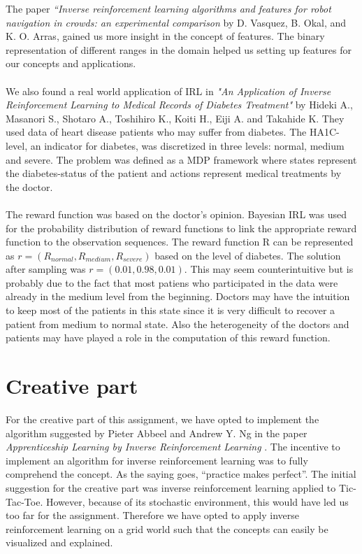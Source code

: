 \documentclass[10pt,a4paper,twocolumn]{article}
\begin{document}
The paper \textit{“Inverse reinforcement learning algorithms and features for robot navigation in crowds: an experimental comparison} \cite{vasquez2014inverse} by D. Vasquez, B. Okal, and K. O. Arras,  gained us more insight in the concept of features. The binary representation of different ranges in the domain helped us setting up features for our concepts and applications. \\\\We also found a real world application of IRL in \textit{"An Application of Inverse Reinforcement Learning to Medical Records of Diabetes Treatment"} \cite{medicalpaper} by Hideki A., Masanori S., Shotaro A., Toshihiro K., Koiti H., Eiji A. and Takahide K. They used data of heart disease patients who may suffer from diabetes. The HA1C-level, an indicator for diabetes, was discretized in three levels: normal, medium and severe. The problem was defined as a MDP framework where states represent the diabetes-status of the patient and actions represent medical treatments by the doctor.\\\\ The reward function was based on the doctor's opinion. Bayesian IRL was used for the probability distribution of reward functions to link the appropriate reward function to the observation sequences. The reward function R can be represented as $r= (R_{normal},R_{medium},R_{severe})$ based on the level of diabetes. The solution after sampling was $r= (0.01, 0.98, 0.01)$. This may seem counterintuitive but is probably due to the fact that most patiens who participated in the data were already in the medium level from the beginning. Doctors may have the intuition to keep most of the patients in this state since it is very difficult to recover a patient from medium to normal state. Also the heterogeneity of the doctors and patients may have played a role in the computation of this reward function. 

\section{Creative part}
For the creative part of this assignment, we have opted to implement the algorithm suggested by Pieter Abbeel and Andrew Y. Ng  in the paper \textit{Apprenticeship Learning by Inverse Reinforcement Learning} \cite{abbeel2004apprenticeship}. The incentive to implement an algorithm for inverse reinforcement learning was to fully comprehend the concept. As the saying goes, ``practice makes perfect''. The initial suggestion for the creative part was inverse reinforcement learning applied to Tic-Tac-Toe. However, because of its stochastic environment, this would have led us too far for the assignment. Therefore we have opted to apply inverse reinforcement learning on a grid world such that the concepts can easily be visualized and explained.
\end{document}
